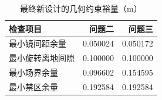 \begin{table}[htbp]
\centering\small
\caption{最终新设计的几何约束裕量（m）}\label{tab:constraints}
\begin{tabular}{lrr}
\toprule
检查项目 & 问题二 & 问题三\\\midrule
最小镜间距余量 & 0.050024 & 0.050172\\
最小旋转离地间隙 & 0.100000 & 0.100000\\
最小场界余量 & 0.096602 & 0.154595\\
最小禁区余量 & 0.192584 & 0.192584\\
\bottomrule
\end{tabular}
\end{table}
